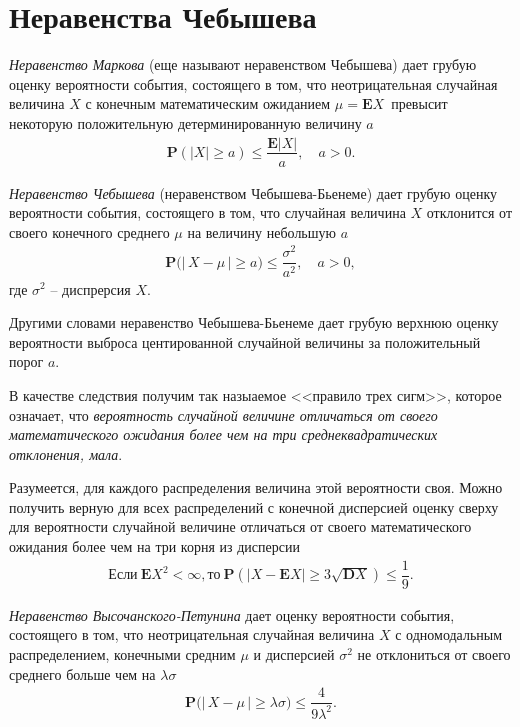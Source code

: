 \documentclass[%
	11pt,
	a4paper,
	utf8,
		]{article}
\begin{document}
\section{Неравенства Чебышева}

\emph{Неравенство Маркова} (еще называют неравенством Чебышева) дает грубую оценку вероятности события, состоящего в том, что неотрицательная случайная величина $ X $ с конечным математическим ожиданием $ \mu = \mathbf{E}X $ превысит некоторую положительную детерминированную величину $ a $
\begin{align*}
	\mathbf{P}(| X | \geqslant a) \leqslant \dfrac{ \mathbf{E} | X | }{a}, \quad a > 0.
\end{align*}

\emph{Неравенство Чебышева} (неравенством Чебышева-Бьенеме) дает грубую оценку вероятности события, состоящего в том, что случайная величина $ X $ отклонится от своего конечного среднего $ \mu $ на величину небольшую $ a $ 
\begin{align*}
	\mathbf{P}\big(|\,X - \mu\,| \geqslant a\big) \leqslant \dfrac{\sigma^2}{a^2}, \quad a > 0,
\end{align*}
где $ \sigma^2 $ -- диспрерсия $ X $.

Другими словами неравенство Чебышева-Бьенеме дает грубую верхнюю оценку вероятности выброса центированной случайной величины за положительный порог $ a $.

В качестве следствия получим так назыаемое <<правило трех сигм>>, которое означает, что \emph{вероятность случайной величине отличаться от своего математического ожидания более чем на три среднеквадратических отклонения, мала}.

Разумеется, для каждого распределения величина этой вероятности своя. Можно получить верную для всех распределений с конечной дисперсией оценку сверху для вероятности случайной величине отличаться от своего математического ожидания более чем на три корня из дисперсии
\begin{align*}
	\text{Если} \ \mathbf{E} X^2 < \infty, \text{то} \ \mathbf{P}( | X - \mathbf{E} X | \geqslant 3 \sqrt{ \mathbf{D} X } ) \leqslant \dfrac{1}{9}.
\end{align*}

\emph{Неравенство Высочанского-Петунина} дает оценку вероятности события, состоящего в том, что неотрицательная случайная величина $ X $ с одномодальным распределением, конечными средним $ \mu $ и дисперсией $ \sigma^2 $ не отклониться от своего среднего больше чем на $ \lambda \sigma $
\begin{align*}
	\mathbf{P} \big( |\,X - \mu\,| \geqslant \lambda \sigma \big) \leqslant \dfrac{4}{9 \lambda^2}.
\end{align*}
\end{document}
